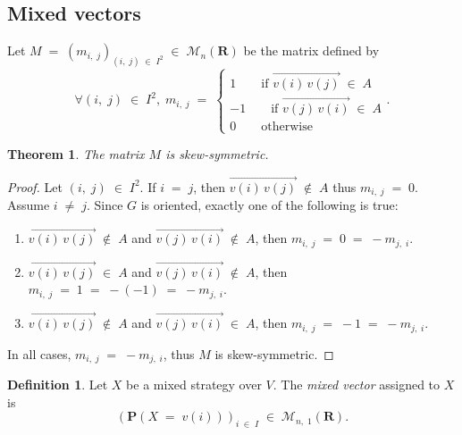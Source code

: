 \documentclass{report}
\theoremstyle{definition}
\newtheorem{defn}{Definition}
\theoremstyle{plain}
\newtheorem{thm}{Theorem}
\begin{document}
\subsection{Mixed vectors}
Let $M\;=\;\left(m_{i,\;j}\right)_{\left(i,\;j\right)\;\in\;I^2}
\;\in\;\mathscr M_n\left(\mathbf R\right)$ be the matrix defined by \[
	\forall\left(i,\;j\right)\;\in\;I^2,\;m_{i,\;j}\;=\;
	\begin{cases}
		1\qquad\text{if }
			\overrightarrow{v\left(i\right)\,v\left(j\right)}
				\;\in\;A \\
		-1\qquad\text{if }
			\overrightarrow{v\left(j\right)\,v\left(i\right)}
				\;\in\;A \\
		0\qquad\text{otherwise}
	\end{cases}.
\]

\begin{thm}
	The matrix $M$ is skew-symmetric.
\end{thm}
\begin{proof}
	Let $\left(i,\;j\right)\;\in\;I^2$. If $i\;=\;j$, then
	$\overrightarrow{v\left(i\right)\,v\left(j\right)}\;\notin\;A$ thus
	$m_{i,\;j}\;=\;0$. Assume $i\;\neq\;j$. Since $G$ is oriented, exactly
	one of the following is true:
	\begin{enumerate}
	\item $\overrightarrow{v\left(i\right)\,v\left(j\right)}\;\notin\;A$
	      and
	      $\overrightarrow{v\left(j\right)\,v\left(i\right)}\;\notin\;A$,
	      then $m_{i,\;j}\;=\;0\;=\;-m_{j,\;i}$.
	\item $\overrightarrow{v\left(i\right)\,v\left(j\right)}\;\in\;A$
	      and
	      $\overrightarrow{v\left(j\right)\,v\left(i\right)}\;\notin\;A$,
	      then $m_{i,\;j}\;=\;1\;=\;-\left(-1\right)\;=\;-m_{j,\;i}$.
	\item $\overrightarrow{v\left(i\right)\,v\left(j\right)}\;\notin\;A$
	      and
	      $\overrightarrow{v\left(j\right)\,v\left(i\right)}\;\in\;A$,
	      then $m_{i,\;j}\;=\;-1\;=\;-m_{j,\;i}$.
	\end{enumerate}
	In all cases, $m_{i,\;j}\;=\;-m_{j,\;i}$, thus $M$ is skew-symmetric.
\end{proof}

\begin{defn}
	Let $X$ be a mixed strategy over $V$. The \emph{mixed vector} assigned
	to $X$ is \[
		\left(\mathbf P\left(X\;
				=\;v\left(i\right)\right)\right)
			_{i\;\in\;I}
		\;\in\;\mathscr M_{n,\;1}\left(\mathbf R\right).
	\]
\end{defn}
\end{document}
